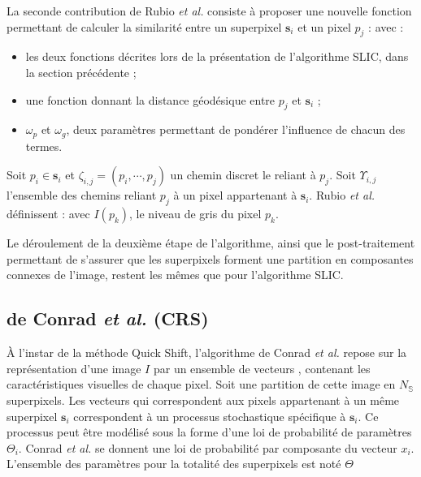 La seconde contribution de Rubio \textit{et al.} consiste à proposer une nouvelle fonction permettant de calculer la similarité entre un superpixel $\mathbf{s}_{i}$ et un pixel $p_{j}$ :
avec :
\begin{itemize}
\item {} les deux fonctions décrites lors de la présentation de l'algorithme SLIC, dans la section précédente ;
\item {} une fonction donnant la distance géodésique entre $p_{j}$ et $\mathbf{s}_{i}$ ;
\item $\omega_{p}$ et $\omega_{g}$, deux paramètres permettant de pondérer l'influence de chacun des termes.
\end{itemize}

Soit $p_{i} \in \mathbf{s}_{i}$ et $\zeta_{i,j}=(p_{i},\cdots,p_{j})$ un chemin discret le reliant à $p_{j}$. Soit $\Upsilon_{i,j}$ l'ensemble des chemins reliant $p_{j}$ à un pixel appartenant à $\mathbf{s}_{i}$. Rubio \textit{et al.} définissent :
avec $I(p_{k})$, le niveau de gris du pixel $p_{k}$.

Le déroulement de la deuxième étape de l'algorithme, ainsi que le post-traitement permettant de s'assurer que les superpixels forment une partition en composantes connexes de l'image, restent les mêmes que pour l'algorithme SLIC.

\subsection{ de Conrad \textit{et al.} (CRS)}
À l’instar de la méthode Quick Shift, l'algorithme de Conrad \textit{et al.} \cite{conrad2013contour} repose sur la représentation d'une image $I$ par un ensemble de vecteurs , contenant les caractéristiques visuelles de chaque pixel. Soit  une partition de cette image en $N_{\mathbb{S}}$ superpixels. Les vecteurs qui correspondent aux pixels appartenant à un même superpixel $\mathbf{s}_{i}$ correspondent à un processus stochastique spécifique à $\mathbf{s}_{i}$. Ce processus peut être modélisé sous la forme d'une loi de probabilité de paramètres $\Theta_{i}$. Conrad \textit{et al.} \cite{conrad2013contour}  se donnent une loi de probabilité par composante du vecteur $x_{i}$. L'ensemble des paramètres pour la totalité des superpixels est noté $\Theta$


